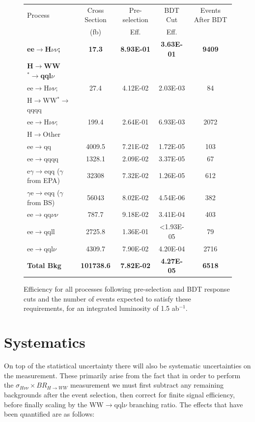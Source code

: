 \begin{figure}
  \centering
  \begin{tabular}{l c c c c}
   \toprule
    Process & Cross Section & Pre-selection & BDT Cut  & Events After BDT     \\
    & (fb) & Eff. & Eff. &      \\
    \midrule
    \midrule
    \bf{ee$\rightarrow$H$\nu\nu$;}            & \bf{17.3}    &  \bf{8.93E-01}  & \bf{3.63E-01} & \bf{9409}    \\
    \bf{H$\rightarrow$WW$^*\rightarrow$qql$\nu$} & & & & \\
    \midrule
    \midrule
    ee$\rightarrow$H$\nu\nu$;  & 27.4    & 4.12E-02 & 2.03E-03 & 84  \\
    H$\rightarrow$WW$^*\rightarrow$qqqq & & & & \\
    ee$\rightarrow$H$\nu\nu$; & 199.4 & 2.64E-01 & 6.93E-03 & 2072 \\
    H$\rightarrow$Other & & & & \\
    \midrule
    \midrule
    ee$\rightarrow$qq               & 4009.5    & 7.21E-02 &  1.72E-05 & 103  \\ 
    ee$\rightarrow$qqqq               & 1328.1    &  2.09E-02 & 3.37E-05 & 67   \\ 
    e$\gamma$$\rightarrow$eqq ($\gamma$ from EPA)                 & 32308    & 7.32E-02  & 1.26E-05 & 612  \\ 
    $\gamma$e$\rightarrow$eqq ($\gamma$ from BS)               &  56043   & 8.02E-02 & 4.54E-06 & 382  \\ 
    ee$\rightarrow$qq$\nu\nu$               & 787.7    & 9.18E-02 & 3.41E-04 & 403   \\ 
    ee$\rightarrow$qqll               & 2725.8    & 1.36E-01  & <1.93E-05 & 79    \\ 
    ee$\rightarrow$qql$\nu$              & 4309.7    & 7.90E-02  & 4.20E-04 & 2716    \\ 
    \midrule
    \midrule
    \bf{Total Bkg}                    & \bf{101738.6} & \bf{7.82E-02} & \bf{4.27E-05} & \bf{6518} \\
    \midrule
    \bottomrule
  \end{tabular}
  \caption[Samples Used]{Efficiency for all processes following pre-selection and BDT response cuts and the number of events expected to satisfy these requirements, for an integrated luminosity of 1.5 ab$^{-1}$.}
  \label{cuts}
\end{figure}

\section{Systematics}
\label{higgsSystematics}
On top of the statistical uncertainty there will also be systematic uncertainties on the measurement. These primarily arise from the fact that in order to perform the $\sigma_{H\nu\nu}\times BR_{H\rightarrow WW}$ measurement we must first subtract any remaining backgrounds after the event selection, then correct for finite signal efficiency, before finally scaling by the WW$\rightarrow$qql$\nu$ branching ratio. The  effects that have been quantified  are as follows:

